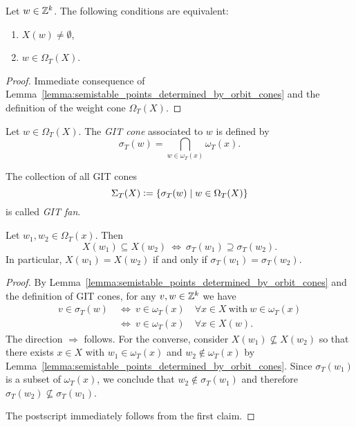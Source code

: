 \begin{coro} Let $w\in\mathbb{Z}^k$. The following conditions are equivalent:
	\begin{enumerate}[label={\upshape(\roman*)}]
	\item $X(w) \neq \emptyset$,
	\item $w\in\Omega_T(X)$.
	\end{enumerate}
\end{coro}
\begin{proof}
	Immediate consequence of Lemma~\ref{lemma:semistable_points_determined_by_orbit_cones} and the definition of the weight cone $\Omega_T(X)$.
\end{proof}

\begin{defi}
Let $w\in\Omega_T(X)$. The \emph{GIT cone} associated to $w$ is defined by
$$\sigma_T(w) = \bigcap_{w\in\omega_T(x)} \omega_T(x).$$
%

The collection of all GIT cones
$$\Sigma_T(X) \mathrel{\mathop:}= \{\sigma_T(w)\mid w\in\Omega_T(X)\}$$
is called \emph{GIT fan}.
%
\end{defi}

\begin{prop}
	\label{prop:equivalence_git_cones_semistable_points}
	Let $w_1, w_2\in \Omega_T(x)$. Then
	$$X(w_1)\subseteq X(w_2) \ \Longleftrightarrow\ \sigma_T(w_1) \supseteq \sigma_T(w_2).$$
	In particular, $X(w_1) = X(w_2)$ if and only if $\sigma_T(w_1) = \sigma_T(w_2)$.
\end{prop}
\begin{proof}
	By Lemma~\ref{lemma:semistable_points_determined_by_orbit_cones} and the definition of GIT cones, for any $v,w\in\mathbb{Z}^k$ we have
	\begin{align*}
		v\in\sigma_T(w) &\ \Leftrightarrow\ v\in \omega_T(x)\quad \forall x\in X\ \mathrm{with}\ w\in\omega_T(x) \\
		&\ \Leftrightarrow\ v\in \omega_T(x)\quad \forall x\in X(w).
	\end{align*}
	The direction $\Rightarrow$ follows. For the converse, consider $X(w_1) \nsubseteq X(w_2)$ so that there exists $x\in X$ with $w_1\in \omega_T(x)$ and $w_2\notin \omega_T(x)$ by Lemma~\ref{lemma:semistable_points_determined_by_orbit_cones}. Since $\sigma_T(w_1)$ is a subset of $\omega_T(x)$, we conclude that $w_2\notin\sigma_T(w_1)$ and therefore $\sigma_T(w_2)\nsubseteq\sigma_T(w_1)$.
	
	The postscript immediately follows from the first claim.
\end{proof}

